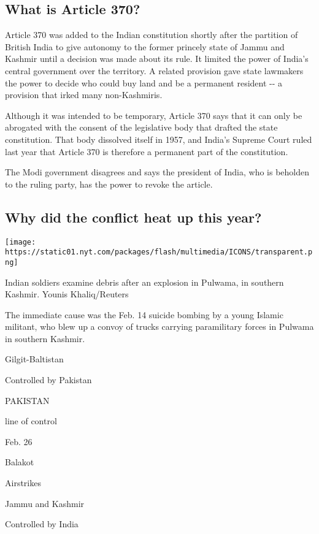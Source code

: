 \hypertarget{what-is-article-370}{%
\subsection{What is Article 370?}\label{what-is-article-370}}

Article 370 was added to the Indian constitution shortly after the
partition of British India to give autonomy to the former princely state
of Jammu and Kashmir until a decision was made about its rule. It
limited the power of India's central government over the territory. A
related provision gave state lawmakers the power to decide who could buy
land and be a permanent resident -\/- a provision that irked many
non-Kashmiris.

Although it was intended to be temporary, Article 370 says that it can
only be abrogated with the consent of the legislative body that drafted
the state constitution. That body dissolved itself in 1957, and India's
Supreme Court ruled last year that Article 370 is therefore a permanent
part of the constitution.

The Modi government disagrees and says the president of India, who is
beholden to the ruling party, has the power to revoke the article.

\hypertarget{why-did-the-conflict-heat-up-this-year}{%
\subsection{Why did the conflict heat up this
year?}\label{why-did-the-conflict-heat-up-this-year}}

\texttt{[image: https://static01.nyt.com/packages/flash/multimedia/ICONS/transparent.png]}

Indian soldiers examine debris after an explosion in Pulwama, in
southern Kashmir. Younis Khaliq/Reuters

The immediate cause was the Feb. 14 suicide bombing by a young Islamic
militant, who blew up a convoy of trucks carrying paramilitary forces in
Pulwama in southern Kashmir.

Gilgit-Baltistan

Controlled by Pakistan

PAKISTAN

line of control

Feb. 26

Balakot

Airstrikes

Jammu and Kashmir

Controlled by India

